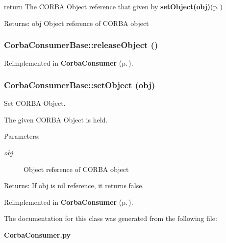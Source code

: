 return The CORBA Object reference that given by {\bf set\-Object(obj)}{\rm (p.\,\pageref{classCorbaConsumerBase_CorbaConsumerBasea3})} \begin{Desc}
\item[Returns:]obj Object reference of CORBA object\end{Desc}
\subsubsection{\setlength{\rightskip}{0pt plus 5cm}Corba\-Consumer\-Base::release\-Object ()}\label{classCorbaConsumerBase_CorbaConsumerBasea5}




Reimplemented in {\bf Corba\-Consumer} {\rm (p.\,\pageref{classCorbaConsumer_CorbaConsumera5})}.
\subsubsection{\setlength{\rightskip}{0pt plus 5cm}Corba\-Consumer\-Base::set\-Object (obj)}\label{classCorbaConsumerBase_CorbaConsumerBasea3}


Set CORBA Object. 

The given CORBA Object is held. \begin{Desc}
\item[Parameters:]
\begin{description}
\item[{\em obj}]Object reference of CORBA object \end{description}
\end{Desc}
\begin{Desc}
\item[Returns:]If obj is nil reference, it returns false.\end{Desc}


Reimplemented in {\bf Corba\-Consumer} {\rm (p.\,\pageref{classCorbaConsumer_CorbaConsumera3})}.

The documentation for this class was generated from the following file:\begin{CompactItemize}
\item 
{\bf Corba\-Consumer.py}\end{CompactItemize}
